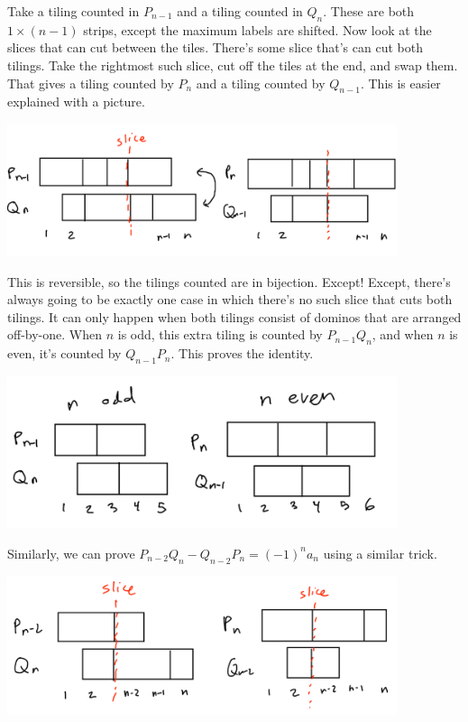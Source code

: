 \documentclass[11pt,paper=letter]{scrartcl}
\begin{document}
Take a tiling counted in $P_{n-1}$ and a tiling counted in $Q_n$. These are both $1 \times (n-1)$ strips, except the maximum labels are shifted. Now look at the slices that can cut between the tiles. There's some slice that's can cut both tilings. Take the rightmost such slice, cut off the tiles at the end, and swap them. That gives a tiling counted by $P_n$ and a tiling counted by $Q_{n-1}$. This is easier explained with a picture.

\begin{center}
\includegraphics[width=4.5in]{4.png}
\end{center}

This is reversible, so the tilings counted are in bijection. Except! Except, there's always going to be exactly one case in which there's no such slice that cuts both tilings. It can only happen when both tilings consist of dominos that are arranged off-by-one. When $n$ is odd, this extra tiling is counted by $P_{n-1}Q_n$, and when $n$ is even, it's counted by $Q_{n-1}P_n$. This proves the identity.

\begin{center}
\includegraphics[width=4.5in]{5.png}
\end{center}

Similarly, we can prove $P_{n-2}Q_n - Q_{n-2}P_n = (-1)^na_n$ using a similar trick.

\begin{center}
\includegraphics[width=4.5in]{6.png}
\end{center}
\end{document}
